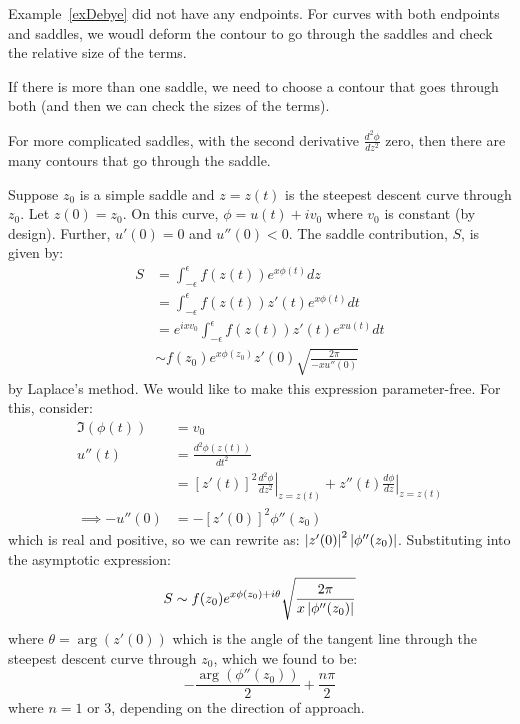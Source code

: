 \documentclass[../Main.tex]{subfiles}
\begin{document}
\begin{remarks}
    \item Example~\ref{exDebye} did not have any endpoints. For curves with both endpoints and saddles, we woudl deform the contour to go through the saddles and check the relative size of the terms.
    \item If there is more than one saddle, we need to choose a contour that goes through both (and then we can check the sizes of the terms).
    \item For more complicated saddles, with the second derivative $\frac{d^{2}\phi}{d z^{2}}$ zero, then there are many contours that go through the saddle.
\end{remarks}
Suppose $z_0$ is a simple saddle and $z = z(t)$ is the steepest descent curve through $z_0$. Let $z(0) = z_0$. On this curve, $\phi = u(t) + iv_0$ where $v_0$ is constant (by design). Further, $u'(0) = 0$ and $u''(0) < 0$. The saddle contribution, $S$, is given by:
\begin{align*}
    S &= \int_{-\epsilon}^{\epsilon} f(z(t)) e^{x\phi(t)} dz \\
    &= \int_{-\epsilon}^{\epsilon} f(z(t)) z'(t) e^{x\phi(t)} dt \\
    &= e^{ix v_0} \int_{-\epsilon}^{\epsilon} f(z(t)) z'(t) e^{xu(t)} dt \\
    &\sim f(z_0) e^{x\phi(z_0)} z'(0) \sqrt{\frac{2\pi}{-xu''(0)}}
\end{align*}
by Laplace's method. We would like to make this expression parameter-free. For this, consider:
\begin{align*}
    \Im(\phi(t)) &= v_0 \\
    u''(t) &= \frac{d^{2}\phi(z(t))}{dt^{2}} \\
    &= [z'(t)]^2 \left. \frac{d^{2}\phi}{dz^{2}}\right|_{z = z(t)} + z''(t) \left.\frac{d\phi}{dz}\right|_{z = z(t)} \\
    \implies -u''(0) &= -[z'(0)]^2 \phi''(z_0)
\end{align*}
which is real and positive, so we can rewrite as: $\left|z'(0)\right|^2 \left|\phi''(z_0)\right|$. Substituting into the asymptotic expression:
\begin{equation}
    S \sim f(z_0) e^{x\phi(z_0) + i\theta} \sqrt{\frac{2\pi}{x\left|\phi''(z_0)\right|}}
    \label{eqnSaddleContribution}
\end{equation}
where $\theta = \operatorname{arg}(z'(0))$ which is the angle of the tangent line through the steepest descent curve through $z_0$, which we found to be:
\begin{equation*}
    -\frac{\operatorname{arg}(\phi''(z_0))}{2} + \frac{n\pi}{2}
\end{equation*}
where $n = 1$ or $3$, depending on the direction of approach.
\end{document}
